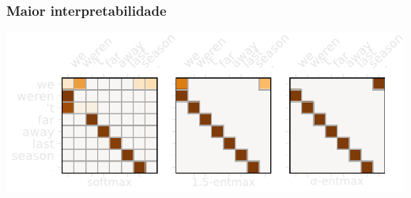 \documentclass[xetex,aspectratio=169,xcolor,professionalfonts,hyperref]{beamer}
\begin{document}
\begin{frame}
    \frametitle{Maior interpretabilidade}
    \vspace{-0.5cm}
    \begin{center}
        \includegraphics[width=0.9\columnwidth]{figures/head_prev_mybg}\\
        \fontsize{12pt}{15}\selectfont
    \end{center}

\end{frame}


\end{document}
